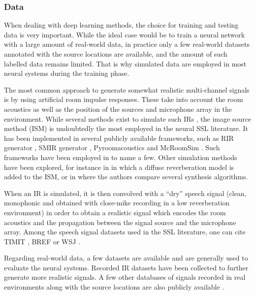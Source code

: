 \subsubsection{Data}

When dealing with deep learning methods, the choice for training and testing data is very important. While the ideal case would be to train a neural network with a large amount of real-world data, in practice only a few real-world datasets annotated with the source locations are available, and the amount of such labelled data remains limited. That is why simulated data are employed in most neural systems during the training phase. 

The most common approach to generate somewhat realistic multi-channel signals is by using artificial room impulse responses. These take into account the room acoustics as well as the position of the sources and microphone array in the environment. While several methods exist to simulate such IRs \cite{svensson_computational_2002}, the image source method (ISM) \cite{allen_image_1979} is undoubtedly the most employed in the neural SSL literature. It has been implemented in several publicly available frameworks, such as RIR generator \cite{habets_room_2006}, SMIR generator \cite{jarrett_rigid_2012}, Pyroomacoustics \cite{scheibler_pyroomacoustics_2018} and McRoomSim \cite{wabnitz_room_2010}. Such frameworks have been employed in \cite{chakrabarty_multi-speaker_2017,perotin_crnn-based_2018,nguyen_robust_2020,varanasi_deep_2020,salvati_exploiting_2018} to name a few. Other simulation methods have been explored, for instance in \cite{hirvonen_classication_2015} in which a diffuse reverberation model is added to the ISM, or in \cite{gelderblom_synthetic_2021} where the authors compare several synthesis algorithms.

When an IR is simulated, it is then convolved with a ``dry'' speech signal (clean, monophonic and obtained with close-mike recording in a low reverberation environment) in order to obtain a realistic signal which encodes the room acoustics and the propagation between the signal source and the microphone array. Among the speech signal datasets used in the SSL literature, one can cite TIMIT \cite{garofolo_timit_1993}, BREF \cite{larnel_bref_1991} or WSJ \cite{garofolo_csr-i_2007}.

Regarding real-world data, a few datasets are available and are generally used to evaluate the neural systems. Recorded IR datasets \cite{cristoforetti_dirha_2014, francombe_iosr_2017, hadad_multichannel_2014} have been collected to further generate more realistic signals. A few other databases of signals recorded in real environments along with the source locations are also publicly available \cite{politis_dataset_2021, evers_locata_2020, guizzo_l3das21_2021}.


